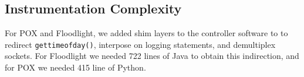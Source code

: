 %



%

\subsection{Instrumentation Complexity}

For POX and Floodlight, we added shim layers to the controller software to
to redirect {\tt gettimeofday()}, interpose on logging
statements, and demultiplex sockets. For Floodlight we needed 722 lines of Java to obtain this
indirection, and for POX we needed 415 line of Python.


